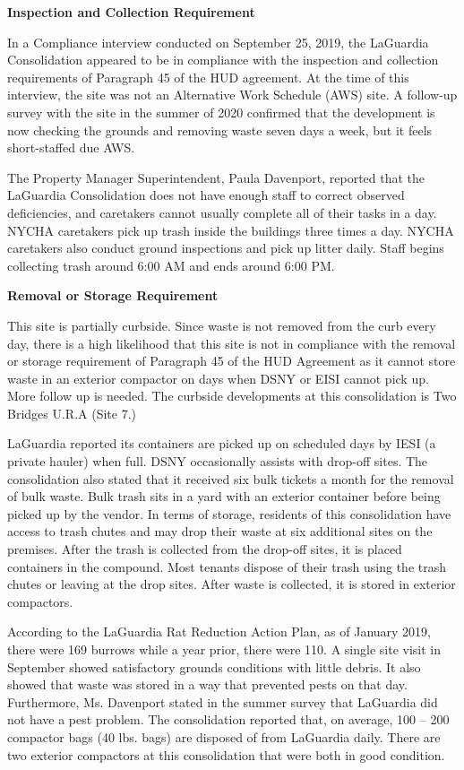 

\textbf{Inspection and Collection Requirement}

In a Compliance interview conducted on September 25, 2019, the LaGuardia Consolidation appeared to be in compliance with the inspection and collection requirements of Paragraph 45 of the HUD agreement. At the time of this interview, the site was not an Alternative Work Schedule (AWS) site. A follow-up survey with the site in the summer of 2020 confirmed that the development is now checking the grounds and removing waste seven days a week, but it feels short-staffed due AWS. 

The Property Manager Superintendent, Paula Davenport, reported that the LaGuardia Consolidation does not have enough staff to correct observed deficiencies, and caretakers cannot usually complete all of their tasks in a day. NYCHA caretakers pick up trash inside the buildings three times a day. NYCHA caretakers also conduct ground inspections and pick up litter daily. Staff begins collecting trash around 6:00 AM and ends around 6:00 PM.

\textbf{Removal or Storage Requirement}

This site is partially curbside. Since waste is not removed from the curb every day, there is a high likelihood that this site is not in compliance with the removal or storage requirement of Paragraph  45 of the HUD Agreement as it cannot store waste in an exterior compactor on days when DSNY or EISI cannot pick up. More follow up is needed. The curbside developments at this consolidation is Two Bridges U.R.A (Site 7.)

LaGuardia reported its containers are picked up on scheduled days by IESI (a private hauler) when full. DSNY occasionally assists with drop-off sites.  The consolidation also stated that it received six bulk tickets a month for the removal of bulk waste. Bulk trash sits in a yard with an exterior container before being picked up by the vendor. In terms of storage, residents of this consolidation have access to trash chutes and may drop their waste at six additional sites on the premises. After the trash is collected from the drop-off sites, it is placed containers in the compound. Most tenants dispose of their trash using the trash chutes or leaving at the drop sites. After waste is collected, it is stored in exterior compactors.  

According to the LaGuardia Rat Reduction Action Plan, as of January 2019, there were 169 burrows while a year prior, there were 110. A single site visit in September showed satisfactory grounds conditions with little debris. It also showed that waste was stored in a way that prevented pests on that day. Furthermore, Ms. Davenport stated in the summer survey that LaGuardia did not have a pest problem. The consolidation reported that, on average, 100 -- 200 compactor bags (40 lbs. bags) are disposed of from LaGuardia daily. There are two exterior compactors at this consolidation that were both in good condition. 

